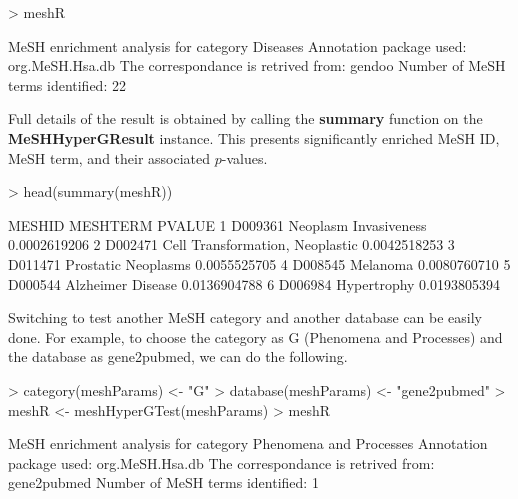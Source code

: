 \documentclass[11pt]{article}
\begin{document}
\begin{center}
\begin{Schunk}
\begin{Sinput}
> meshR
\end{Sinput}
\begin{Soutput}
MeSH enrichment analysis for category Diseases 
Annotation package used:  org.MeSH.Hsa.db 
The correspondance is retrived from:  gendoo 
Number of MeSH terms identified:  22 
\end{Soutput}
\end{Schunk}
\end{center}

Full details of the result is obtained by calling the \textbf{summary} function on the \textbf{MeSHHyperGResult} instance.
This presents significantly enriched MeSH ID, MeSH term, and their associated $p$-values.

\begin{center}
\begin{Schunk}
\begin{Sinput}
> head(summary(meshR))
\end{Sinput}
\begin{Soutput}
   MESHID                        MESHTERM       PVALUE
1 D009361           Neoplasm Invasiveness 0.0002619206
2 D002471 Cell Transformation, Neoplastic 0.0042518253
3 D011471             Prostatic Neoplasms 0.0055525705
4 D008545                        Melanoma 0.0080760710
5 D000544               Alzheimer Disease 0.0136904788
6 D006984                     Hypertrophy 0.0193805394
\end{Soutput}
\end{Schunk}
\end{center}

Switching to test another MeSH category and another database can be easily done.
For example, to choose the category as G (Phenomena and Processes) and the database as gene2pubmed, we can do the following.

\begin{center}
\begin{Schunk}
\begin{Sinput}
> category(meshParams) <- "G"
> database(meshParams) <- "gene2pubmed"
> meshR <- meshHyperGTest(meshParams)
> meshR
\end{Sinput}
\begin{Soutput}
MeSH enrichment analysis for category Phenomena and Processes 
Annotation package used:  org.MeSH.Hsa.db 
The correspondance is retrived from:  gene2pubmed 
Number of MeSH terms identified:  1 
\end{Soutput}
\end{Schunk}
\end{center}
\end{document}
